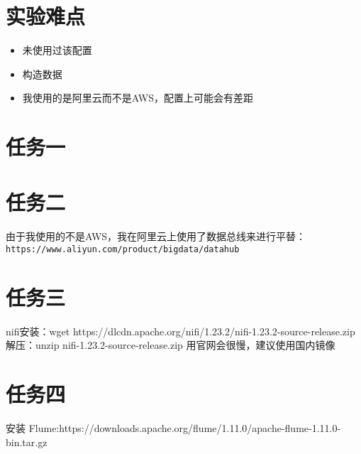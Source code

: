 \documentclass{article}
\begin{document}
\section*{实验难点}
\begin{itemize}
    \item 未使用过该配置
    \item 构造数据
    \item 我使用的是阿里云而不是AWS，配置上可能会有差距
\end{itemize}
\section*{任务一}




\section*{任务二}
由于我使用的不是AWS，我在阿里云上使用了数据总线来进行平替：\verb|https://www.aliyun.com/product/bigdata/datahub|
\section*{任务三}
nifi安装：wget https://dlcdn.apache.org/nifi/1.23.2/nifi-1.23.2-source-release.zip\\
解压：unzip nifi-1.23.2-source-release.zip
用官网会很慢，建议使用国内镜像
\section*{任务四}
安装 Flume:https://downloads.apache.org/flume/1.11.0/apache-flume-1.11.0-bin.tar.gz
\end{document}
